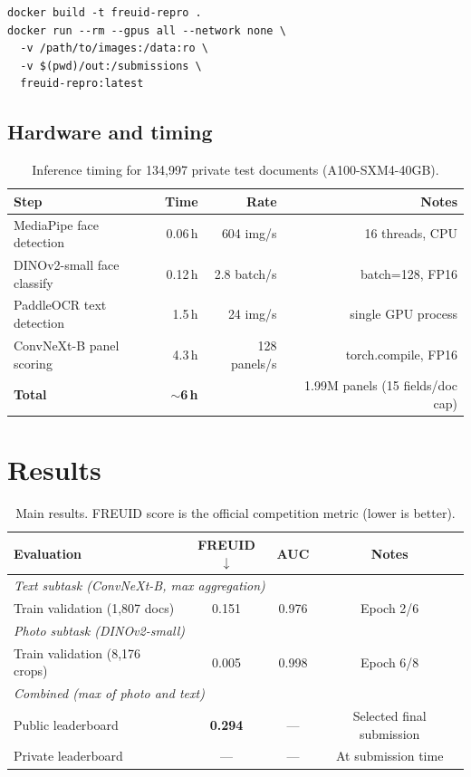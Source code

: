 \documentclass[11pt,a4paper]{article}
\begin{document}
\begin{verbatim}
docker build -t freuid-repro .
docker run --rm --gpus all --network none \
  -v /path/to/images:/data:ro \
  -v $(pwd)/out:/submissions \
  freuid-repro:latest
\end{verbatim}

\subsection{Hardware and timing}

\begin{table}[H]
  \centering
  \small
  \caption{Inference timing for 134{,}997 private test documents (A100-SXM4-40GB).}
  \label{tab:timing}
  \begin{tabular}{lrrr}
    \toprule
    Step & Time & Rate & Notes \\
    \midrule
    MediaPipe face detection    & 0.06\,h &  604 img/s & 16 threads, CPU \\
    DINOv2-small face classify  & 0.12\,h &  2.8 batch/s & batch=128, FP16 \\
    PaddleOCR text detection    & 1.5\,h  &   24 img/s & single GPU process \\
    ConvNeXt-B panel scoring    & 4.3\,h  &  128 panels/s & torch.compile, FP16 \\
    \midrule
    \textbf{Total}              & \textbf{$\sim$6\,h} & & 1.99M panels (15 fields/doc cap) \\
    \bottomrule
  \end{tabular}
\end{table}

\section{Results}
\label{sec:results}

\begin{table}[H]
  \centering
  \caption{Main results. FREUID score is the official competition metric
           (lower is better).}
  \label{tab:results_main}
  \begin{tabular}{lccc}
    \toprule
    Evaluation & FREUID $\downarrow$ & AUC & Notes \\
    \midrule
    \multicolumn{4}{l}{\textit{Text subtask (ConvNeXt-B, max aggregation)}} \\
    \quad Train validation (1{,}807 docs) & 0.151 & 0.976 & Epoch 2/6 \\
    \midrule
    \multicolumn{4}{l}{\textit{Photo subtask (DINOv2-small)}} \\
    \quad Train validation (8{,}176 crops) & 0.005 & 0.998 & Epoch 6/8 \\
    \midrule
    \multicolumn{4}{l}{\textit{Combined (max of photo and text)}} \\
    \quad Public leaderboard & \textbf{0.294} & --- & Selected final submission \\
    \quad Private leaderboard & --- & --- & At submission time \\
    \bottomrule
  \end{tabular}
\end{table}
\end{document}
